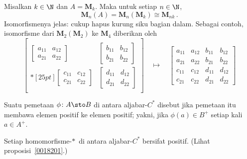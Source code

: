 \begin{exam} Misalkan $k \in \N$ dan $A = \mathbf M_k$. Maka untuk setiap $n \in \N$,
   \[ \mathbf M_n(A) = \mathbf M_n(\mathbf M_k) \cong \mathbf M_{nk}\,. \]
Isomorfismenya jelas: cukup hapus kurung siku bagian dalam. Sebagai contoh,
isomorfisme dari $\mathbf M_2(\mathbf M_2)$ ke $\mathbf M_4$ diberikan oleh
  \[ \begin{bmatrix} {} & {} \\
          \begin{bmatrix}
                          a_{11} & a_{12} \\
                          a_{21} & a_{22}
          \end{bmatrix}       &
          \begin{bmatrix} b_{11} & b_{12} \\
                          b_{21} & b_{22}
          \end{bmatrix}       \\*[25pt]
          \begin{bmatrix} c_{11} & c_{12} \\
                          c_{21} & c_{22}
          \end{bmatrix}       &
          \begin{bmatrix} d_{11} & d_{12} \\
                          d_{21} & d_{22}
          \end{bmatrix}       \\
                    {}  & {}
     \end{bmatrix}
    \quad \mapsto \quad
          \begin{bmatrix} a_{11} & a_{12} & b_{11} & b_{12} \\
                          a_{21} & a_{22} & b_{21} & b_{22} \\
                          c_{11} & c_{12} & d_{11} & d_{12} \\
                          c_{21} & c_{22} & d_{21} & d_{22}
          \end{bmatrix}
  \]
\end{exam}

\begin{defn} Suatu pemetaan $\phi\colon A \sto B$ di antara aljabar-$C^*$ disebut  jika
pemetaan itu membawa elemen positif ke elemen positif; yakni, jika $\phi(a) \in B^+$ setiap kali
$a \in A^+$.
\end{defn}

\begin{exam} Setiap homomorfisme-$*\,$ di antara aljabar-$C^*$ bersifat positif. (Lihat
proposisi~\ref{0018201}.)
\end{exam}

